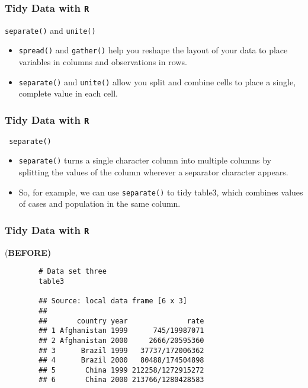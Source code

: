 \documentclass[TIDYMASTER.tex]{subfiles}
\begin{document}
 
	
\begin{frame}[fragile]
\frametitle{Tidy Data with \texttt{R}}
\Large
\vspace{-1cm}
\noindent \texttt{separate()} and \texttt{unite()}
\begin{itemize}
\item \texttt{spread()} and \texttt{gather()} help you reshape the layout of your data to place variables in columns and observations in rows.  \bigskip
\item \texttt{separate()} and \texttt{unite()} allow you split and combine cells to place a single, complete value in each cell.
\end{itemize}


\end{frame}
\begin{frame}[fragile]
	\frametitle{Tidy Data with \texttt{R}}
	\Large
\noindent \texttt{ separate() }\\
\begin{itemize}
\item \texttt{separate()} turns a single character column into multiple columns by splitting the values of the column wherever a separator character appears.
%
\item So, for example, we can use \texttt{separate()} to tidy table3, which combines values of cases and population in the same column.
\end{itemize}
\end{frame}
\begin{frame}[fragile]
	\frametitle{Tidy Data with \texttt{R}}
	\large
	(\textbf{BEFORE)}
	\begin{framed}
		\begin{verbatim}
		# Data set three
		table3
		
		## Source: local data frame [6 x 3]
		## 
		##       country year              rate
		## 1 Afghanistan 1999      745/19987071
		## 2 Afghanistan 2000     2666/20595360
		## 3      Brazil 1999   37737/172006362
		## 4      Brazil 2000   80488/174504898
		## 5       China 1999 212258/1272915272
		## 6       China 2000 213766/1280428583
		\end{verbatim}
	\end{framed}
\end{frame}
\end{document}
